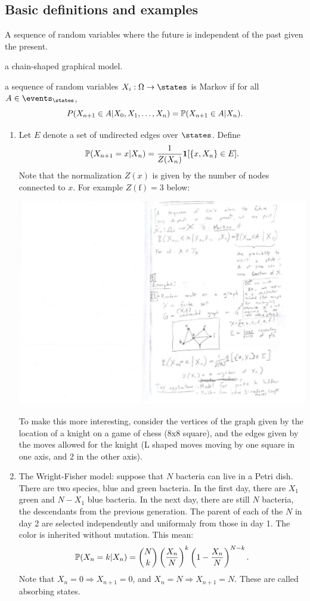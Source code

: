 \documentclass{article}
\begin{document}
\subsection{Basic definitions and examples}

 A sequence of random variables where the future is independent of the past given the present. 

 a chain-shaped graphical model.

 a sequence of random variables $X_i : \Omega \to \states$ is Markov if for all $A \in \events_\states$, 
\[ P(X_{n+1} \in A | X_0, X_1, \dots, X_n) = \P(X_{n+1} \in A | X_n). \]

\begin{enumerate}
  \item Let $E$ denote a set of undirected edges over $\states$. Define \[ \P(X_{n+1} = x | X_n) = \frac{1}{Z(X_n)} \1[\{x, X_n\} \in E]. \]Note that the normalization $Z(x)$ is given by the number of nodes connected to $x$. For example $Z(\text{f}) = 3$ below: 
  \begin{center}
  	\includegraphics[width=0.3\linewidth]{figures/discrete-graph} 
  \end{center}
  To make this more interesting, consider the vertices of the graph given by the location of a knight on a game of chess (8x8 square), and the edges given by the moves allowed for the knight (L shaped moves moving by one square in one axis, and 2 in the other axis). 
  \item The Wright-Fisher model: suppose that $N$ bacteria can live in a Petri dish. There are two species, blue and green bacteria. In the first day, there are $X_1$ green and $N-X_1$ blue bacteria. In the next day, there are still $N$ bacteria, the descendants from the previous generation. The parent of each of the $N$ in day 2 are selected independently and uniformaly from those in day 1. The color is inherited without mutation. This mean: \[ \P(X_n = k | X_n) = \binom{N}{k} \left(\frac{X_n}{N}\right)^k \left( 1 - \frac{X_n}{N}\right)^{N-k}. \]Note that $X_n = 0 \Rightarrow X_{n+1} = 0$, and $X_n = N \Rightarrow X_{n+1} = N$. These are called absorbing states.  
\end{enumerate}
\end{document}
